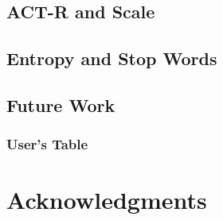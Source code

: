 \documentclass[10pt,letterpaper]{article}
\begin{document}
\subsection{ACT-R and Scale}

\subsection{Entropy and Stop Words}

\subsection{Future Work}

\subsubsection{User's Table}

\section{Acknowledgments}



\setlength{\bibleftmargin}{.125in}
\setlength{\bibindent}{-\bibleftmargin}


\end{document}
